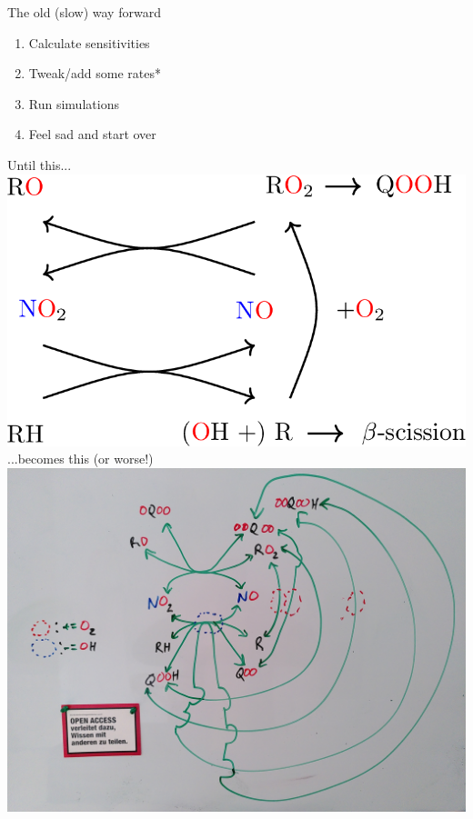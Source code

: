 \documentclass[10pt,presentation]{beamer}
\begin{document}
\begin{frame}{The old (slow) way forward}
	\begin{multicols}{2}
	\begin{enumerate}
		\item Calculate sensitivities
		\item Tweak/add some rates*
		\item Run simulations
		\item Feel sad and start over
	\end{enumerate}
	\columnbreak
	\centering
	{\scriptsize *Until this...\\}
	\vspace{0.1cm}
	\includegraphics[width=0.8\columnwidth]{../figures/NOx_Cycle.png}
	\vspace{0.1cm}
	{\scriptsize ...becomes this (or worse!)}
	\vspace{0.1cm}
	\includegraphics[width=0.8\columnwidth]{../figures/BigNOxCycle.jpg}
	\end{multicols}
\end{frame}
\end{document}
